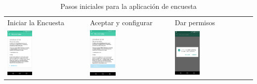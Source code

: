 {\begin{table}[!h]
\begin{tabular}{lll}
\textsf{\relax 
Iniciar la Encuesta
} & \textsf{\relax 
Aceptar y configurar
} & \textsf{\relax 
Dar permisos
}\\
    {\includegraphics[width=0.33\textwidth]{anexos/graphics/app_start.jpg}}
 & 
    {\includegraphics[width=0.33\textwidth]{anexos/graphics/app_start2.jpg}}
 & 
    {\includegraphics[width=0.33\textwidth]{anexos/graphics/app_perm.jpg}}
\\
\end{tabular}
    \caption{Pasos iniciales para la aplicación de encuesta}\label{config:iniapp}
\end{table}

}
